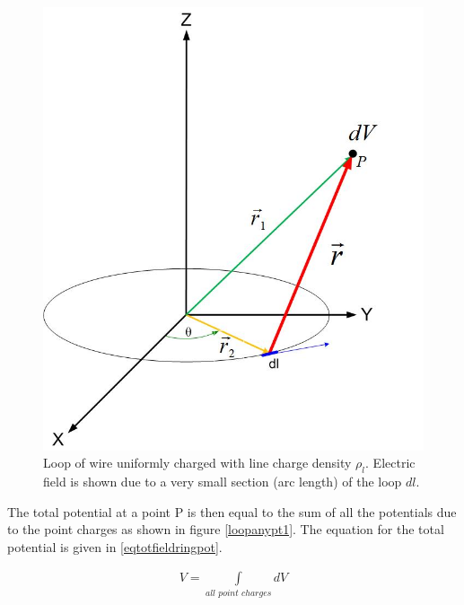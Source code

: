 \documentclass{ximera}
\begin{document}
\begin{figure}[htbp]
\begin{center}
\includegraphics[scale=0.3]{../jpg/Charge_Distributionanypointpot.jpg}
\end{center}
\caption{Loop of wire uniformly charged with line charge density $\rho_l$. Electric field is shown due to a very small section (arc length) of the loop $dl$.}
\label{loopanyptf}
\end{figure}

The total potential at a point P is then equal to the sum of all the potentials due to the point charges as shown in figure \ref{loopanypt1}. The equation for the total potential is given in \ref{eqtotfieldringpot}. 

\begin{eqnarray}
V=\int\limits_{all \,\, point \,\, charges} dV \label{eqtotfieldringpot}
\end{eqnarray}
\end{document}

